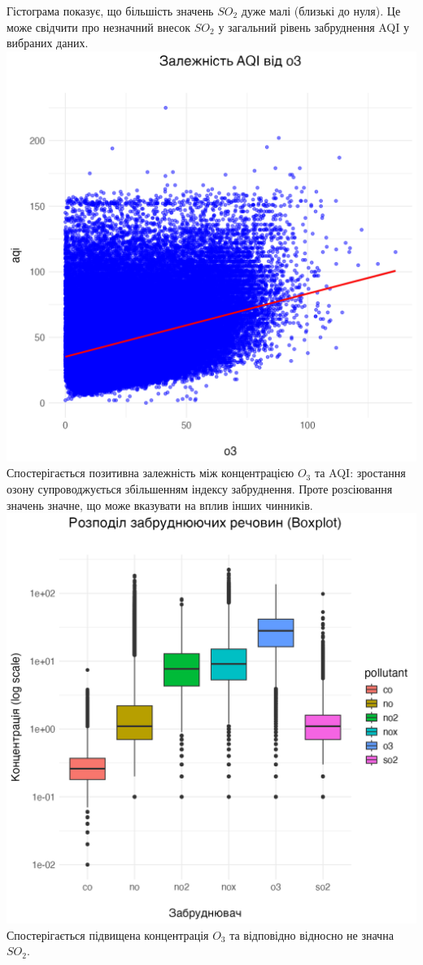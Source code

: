 \documentclass{article}
\begin{document}
\begin{enumerate}
    Гістограма показує, що більшість значень $SO_2$ дуже малі (близькі до нуля).
    Це може свідчити про незначний внесок $SO_2$ у загальний рівень забруднення AQI у вибраних даних.   
    \includegraphics[width=6in]{question2/scatter_plot.png}
    Спостерігається позитивна залежність між концентрацією $O_3$ та AQI: зростання озону супроводжується збільшенням індексу забруднення.
    Проте розсіювання значень значне, що може вказувати на вплив інших чинників.
    \includegraphics[width=6in]{question2/boxplot_pollutants.png}
    Спостерігається підвищена концентрація $O_3$ та відповідно відносно не значна $SO_2$.
    

\end{enumerate}
\end{document}
